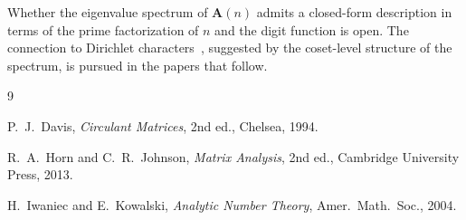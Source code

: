 \documentclass[12pt]{amsart}
\theoremstyle{definition}
\theoremstyle{remark}
\begin{document}
Whether the eigenvalue spectrum of $\mathbf{A}(n)$ admits a
closed-form description in terms of the prime factorization of $n$
and the digit function is open. The connection
to Dirichlet characters~\cite{iwaniec}, suggested by the coset-level
structure of the spectrum, is pursued in the papers that follow.

\begin{thebibliography}{9}

P.~J.~Davis,
\emph{Circulant Matrices},
2nd ed., Chelsea, 1994.

R.~A.~Horn and C.~R.~Johnson,
\emph{Matrix Analysis},
2nd ed., Cambridge University Press, 2013.

H.~Iwaniec and E.~Kowalski,
\emph{Analytic Number Theory},
Amer.\ Math.\ Soc., 2004.

\end{thebibliography}
\end{document}
